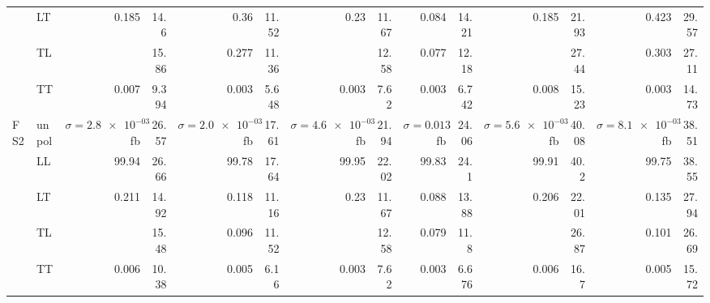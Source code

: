 \begin{table}[h]
{\begin{tabular}{llrrrrrrrrrrrr}
 & LT & \num{0.185} & \num{14.6} & \num{0.36} & \num{11.52} & \num{0.23} & \num{11.67} & \num{0.084} & \num{14.21} & \num{0.185} & \num{21.93} & \num{0.423} & \num{29.57} \\
 & TL &  & \num{15.86} & \num{0.277} & \num{11.36} &  & \num{12.58} & \num{0.077} & \num{12.18} &  & \num{27.44} & \num{0.303} & \num{27.11} \\
 & TT & \num{0.007} & \num{9.394} & \num{0.003} & \num{5.648} & \num{0.003} & \num{7.62} & \num{0.003} & \num{6.742} & \num{0.008} & \num{15.23} & \num{0.003} & \num{14.73} \\
\midrule
\multirow{5}{*}{FS2}
 & unpol & $\sigma = \num{2.8e-03}$ fb & \num{26.57} & $\sigma = \num{2.0e-03}$ fb & \num{17.61} & $\sigma = \num{4.6e-03}$ fb & \num{21.94} & $\sigma = \num{0.013}$ fb & \num{24.06} & $\sigma = \num{5.6e-03}$ fb & \num{40.08} & $\sigma = \num{8.1e-03}$ fb & \num{38.51} \\
 & LL & \num{99.94} & \num{26.66} & \num{99.78} & \num{17.64} & \num{99.95} & \num{22.02} & \num{99.83} & \num{24.1} & \num{99.91} & \num{40.2} & \num{99.75} & \num{38.55} \\
 & LT & \num{0.211} & \num{14.92} & \num{0.118} & \num{11.16} & \num{0.23} & \num{11.67} & \num{0.088} & \num{13.88} & \num{0.206} & \num{22.01} & \num{0.135} & \num{27.94} \\
 & TL &  & \num{15.48} & \num{0.096} & \num{11.52} &  & \num{12.58} & \num{0.079} & \num{11.8} &  & \num{26.87} & \num{0.101} & \num{26.69} \\
 & TT & \num{0.006} & \num{10.38} & \num{0.005} & \num{6.16} & \num{0.003} & \num{7.62} & \num{0.003} & \num{6.676} & \num{0.006} & \num{16.7} & \num{0.005} & \num{15.72} \\
\bottomrule
\end{tabular}
}%
\end{table}